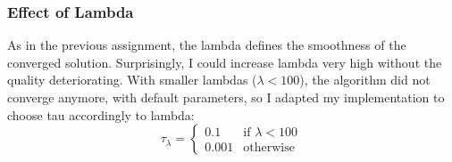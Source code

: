 \documentclass{paper}
\begin{document}
\subsubsection*{Effect of Lambda}
As in the previous assignment, the lambda defines the smoothness of the converged
solution. Surprisingly, I could increase lambda very high without the quality deteriorating.
With smaller lambdas ($ \lambda < 100 $), the algorithm did not converge anymore,
with default parameters, so I adapted my implementation to choose tau accordingly
to lambda:
\begin{equation}
	\tau_\lambda = 
	\begin{cases} 
		0.1 &\mbox{if } \lambda < 100 \\ 
		0.001 & \mbox{otherwise } 
	\end{cases}
\end{equation}
\end{document}
